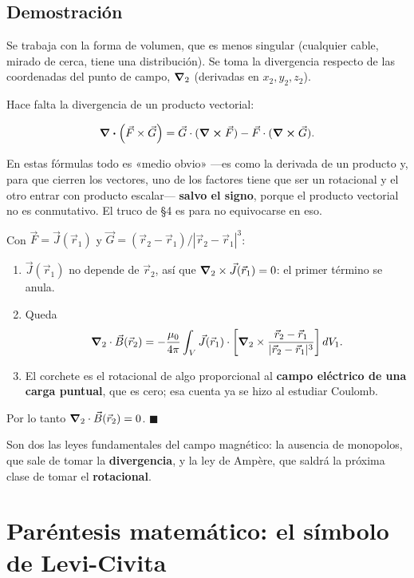 \documentclass[12pt,a4paper]{article}
\begin{document}
\subsection{Demostración}

Se trabaja con la forma de volumen, que es menos singular (cualquier cable,
mirado de cerca, tiene una distribución). Se toma la divergencia respecto de
las coordenadas del punto de campo, $\vnabla_2$ (derivadas en $x_2, y_2, z_2$).

Hace falta la divergencia de un producto vectorial:

\[
\div (\vec F\times\vec G) = \vec G\cdot(\curl \vec F) - \vec F\cdot(\curl \vec G) .
\]

\begin{notebox}
En estas fórmulas todo es «medio obvio» ---es como la derivada de un producto y,
para que cierren los vectores, uno de los factores tiene que ser un
rotacional y el otro entrar con producto escalar--- \textbf{salvo el signo}, porque
el producto vectorial no es conmutativo. El truco de §4 es para no
equivocarse en eso.
\end{notebox}

Con $\vec F = \vec J(\vec r_1)$ y
$\vec G = (\vec r_2-\vec r_1)/|\vec r_2-\vec r_1|^3$:

\begin{enumerate}
  \item $\vec J(\vec r_1)$ no depende de $\vec r_2$, así que
  $\vnabla_2\times\vec J(\vec r_1) = 0$: el primer término se anula.
  \item Queda
  \[
  \vnabla_2\cdot\vec B(\vec r_2) = -\frac{\mu_0}{4\pi}\int_V \vec J(\vec r_1)\cdot
  \left[\vnabla_2\times\frac{\vec r_2-\vec r_1}{|\vec r_2-\vec r_1|^3}\right]dV_1 .
  \]
  \item El corchete es el rotacional de algo proporcional al \textbf{campo eléctrico de
  una carga puntual}, que es cero; esa cuenta ya se hizo al estudiar Coulomb.
\end{enumerate}

Por lo tanto $\vnabla_2\cdot\vec B(\vec r_2) = 0$. $\blacksquare$

Son dos las leyes fundamentales del campo magnético: la ausencia de monopolos,
que sale de tomar la \textbf{divergencia}, y la ley de Ampère, que saldrá la próxima
clase de tomar el \textbf{rotacional}.

\section{Paréntesis matemático: el símbolo de Levi-Civita}
\end{document}
